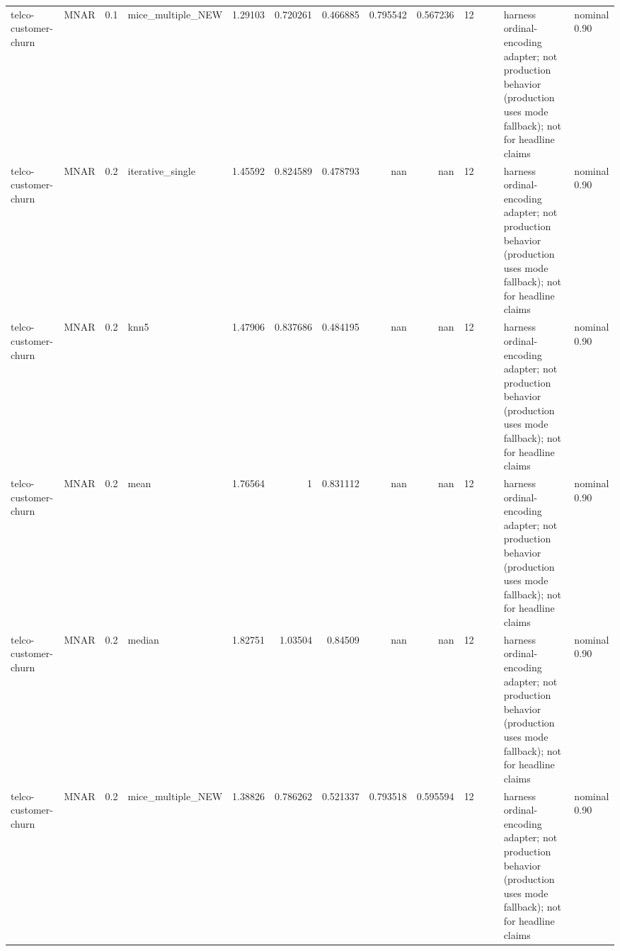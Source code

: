 \begin{table}[ht]
\begin{tabular}{llrlrrrrrrllll}
 telco-customer-churn & MNAR        &         0.1 & mice\_multiple\_NEW &       1.29103  &             0.720261 &                 0.466885 &                       0.795542 &                         0.567236 &        12 &                    &                                         & harness ordinal-encoding adapter; not production behavior (production uses mode fallback); not for headline claims & nominal 0.90              \\
 telco-customer-churn & MNAR        &         0.2 & iterative\_single  &       1.45592  &             0.824589 &                 0.478793 &                     nan        &                       nan        &        12 &                    &                                         & harness ordinal-encoding adapter; not production behavior (production uses mode fallback); not for headline claims & nominal 0.90              \\
 telco-customer-churn & MNAR        &         0.2 & knn5              &       1.47906  &             0.837686 &                 0.484195 &                     nan        &                       nan        &        12 &                    &                                         & harness ordinal-encoding adapter; not production behavior (production uses mode fallback); not for headline claims & nominal 0.90              \\
 telco-customer-churn & MNAR        &         0.2 & mean              &       1.76564  &             1        &                 0.831112 &                     nan        &                       nan        &        12 &                    &                                         & harness ordinal-encoding adapter; not production behavior (production uses mode fallback); not for headline claims & nominal 0.90              \\
 telco-customer-churn & MNAR        &         0.2 & median            &       1.82751  &             1.03504  &                 0.84509  &                     nan        &                       nan        &        12 &                    &                                         & harness ordinal-encoding adapter; not production behavior (production uses mode fallback); not for headline claims & nominal 0.90              \\
 telco-customer-churn & MNAR        &         0.2 & mice\_multiple\_NEW &       1.38826  &             0.786262 &                 0.521337 &                       0.793518 &                         0.595594 &        12 &                    &                                         & harness ordinal-encoding adapter; not production behavior (production uses mode fallback); not for headline claims & nominal 0.90              \\

\end{tabular}
\end{table}
